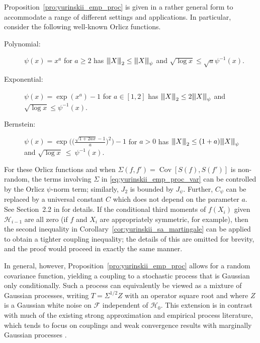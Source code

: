 \documentclass[11pt,lof]{puthesis}
\newcommand{\cH}{\ensuremath{\mathcal{H}}}
\newcommand{\cF}{\ensuremath{\mathcal{F}}}
\newcommand{\vvvert}{{\vert\kern-0.25ex\vert\kern-0.25ex\vert}}
\DeclareMathOperator{\Cov}{Cov}
\theoremstyle{break}
\theoremstyle{proof}
\begin{document}
Proposition~\ref{pro:yurinskii_emp_proc}
is given in a rather general form to accommodate a range of different
settings and applications.
In particular, consider the following well-known Orlicz functions.
%
\begin{description}

\item[Polynomial:]
$\psi(x) = x^a$ for $a \geq 2$
has $\vvvert X \vvvert_2 \leq \vvvert X \vvvert_\psi$ and
$\sqrt{\log x} \leq \sqrt{a} \psi^{-1}(x)$.

\item[Exponential:]
$\psi(x) = \exp(x^a) - 1$ for $a \in [1,2]$
has $\vvvert X \vvvert_2 \leq 2\vvvert X \vvvert_\psi$ and
$\sqrt{\log x} \leq \psi^{-1}(x)$.

\item[Bernstein:]
$\psi(x) = \exp
\Big(
\Big(\frac{\sqrt{1+2ax}-1}{a}\Big)^{2}
\Big)-1$
for $a > 0$ has
$\vvvert X \vvvert_2 \leq (1+a)\vvvert X \vvvert_\psi$ \\ and
$\sqrt{\log x}~\leq~\psi^{-1}(x)$.

\end{description}
%
For these Orlicz functions and when $\Sigma(f, f') = \Cov[S(f), S(f')]$ is
non-random, the terms involving $\Sigma$ in \eqref{eq:yurinskii_emp_proc_var}
can be
controlled by the Orlicz $\psi$-norm term; similarly, $J_2$ is bounded by
$J_\psi$. Further, $C_\psi$ can be replaced by a universal constant $C$ which
does not depend on the parameter $a$. See Section~2.2 in \citet{van1996weak}
for details. If the conditional third moments of $f(X_i)$ given $\cH_{i-1}$ are
all zero (if $f$ and $X_i$ are appropriately symmetric, for example), then the
second inequality in Corollary~\ref{cor:yurinskii_sa_martingale} can be applied
to obtain
a tighter coupling inequality; the details of this are omitted for brevity, and
the proof would proceed in exactly the same manner.

In general, however, Proposition~\ref{pro:yurinskii_emp_proc} allows for a
random
covariance function, yielding a coupling to a stochastic process that is
Gaussian only conditionally. Such a process can equivalently be viewed as a
mixture of Gaussian processes, writing $T=\Sigma^{1/2} Z$ with an operator
square root and where $Z$ is a Gaussian white noise on $\cF$ independent of
$\cH_0$. This extension is in contrast with much of the existing strong
approximation and empirical process literature, which tends to focus on
couplings and weak convergence results with marginally Gaussian processes
\citep{settati2009gaussian,chernozhukov2016empirical}.
\end{document}
